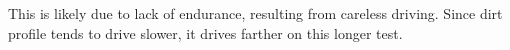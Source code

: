 This is likely due to lack of endurance, resulting from careless driving. Since dirt profile tends to drive slower, it drives farther on this longer test.









